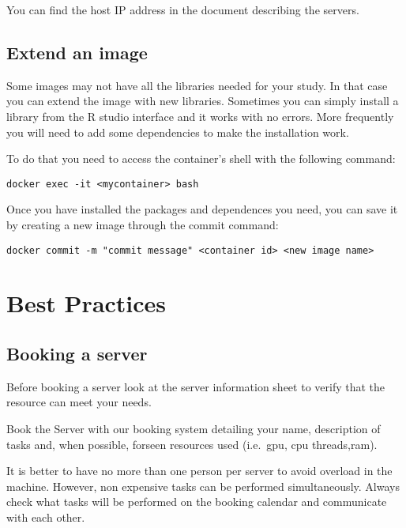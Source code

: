 \documentclass[
]{book}
\begin{document}
You can find the host IP address in the document describing the servers.

\hypertarget{extend-an-image}{%
\section{Extend an image}\label{extend-an-image}}

Some images may not have all the libraries needed for your study. In that case you can extend the image with new libraries. Sometimes you can simply install a library from the R studio interface and it works with no errors. More frequently you will need to add some dependencies to make the installation work.

To do that you need to access the container's shell with the following command:

\begin{verbatim}
docker exec -it <mycontainer> bash
\end{verbatim}

Once you have installed the packages and dependences you need, you can save it by creating a new image through the commit command:

\begin{verbatim}
docker commit -m "commit message" <container id> <new image name>
\end{verbatim}

\hypertarget{best-practices}{%
\chapter{Best Practices}\label{best-practices}}

\hypertarget{booking-a-server}{%
\section{Booking a server}\label{booking-a-server}}

Before booking a server look at the server information sheet to verify that the resource can meet your needs.

Book the Server with our booking system detailing your name, description of tasks and, when possible, forseen resources used (i.e.~gpu, cpu threads,ram).

It is better to have no more than one person per server to avoid overload in the machine. However, non expensive tasks can be performed simultaneously. Always check what tasks will be performed on the booking calendar and communicate with each other.
\end{document}
